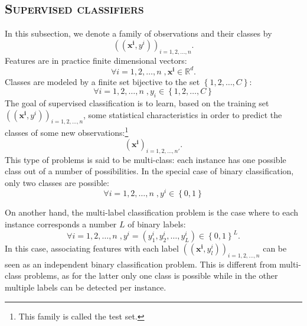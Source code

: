     \subsection{\textsc{Supervised classifiers}}
        \label{subsec::state_of_the_art::mlpr::classifiers}
        In this subsection, we denote a family of observations and their classes by
        \begin{equation*}
            \left((\bm{x^i}, y^i)\right)_{i=1,2,\dots,n}.
        \end{equation*}
        Features are in practice finite dimensional vectors:
        \begin{equation*}
            \forall i=1,2,\dots,n \;, \bm{x^i} \in \mathbb{R}^d.
        \end{equation*}
        Classes are modeled by a finite set bijective to the set \(\left\{1,2,\dots,C\right\}\):
        \begin{equation*}
            \forall i=1,2,\dots,n \;, y_i \in \left\{1,2,\dots,C\right\}            
        \end{equation*}
        The goal of supervised classification is to learn, based on the training set $\left((\bm{x^i}, y^i)\right)_{i=1,2,\dots,n}$, some statistical characteristics in order to predict the classes of some new observations:\footnote{This family is called the test set.}
        \begin{equation*}
            \left(\bm{x^i}\right)_{i=1,2,\dots,n'}.
        \end{equation*}
        This type of problems is said to be multi-class: each instance has one possible class out of a number of possibilities.
        In the special case of binary classification, only two classes are possible:
        \begin{equation*}
            \forall i=1,2,\dots,n \;, y^i \in \left\{0, 1\right\}
        \end{equation*}
        
        On another hand, the multi-label classification problem is the case where to each instance corresponds a number $L$ of binary labels:
        \begin{equation*}
            \forall i=1,2,\dots,n \;, y^i = (y^i_1, y^i_2, \dots, y^i_L) \in \left\{0, 1\right\}^L.
        \end{equation*}
        In this case, associating features with each label \(\left(\left(\bm{x^i}, y^i_l\right)\right)_{i=1,2,\dots,n}\) can be seen as an independent binary classification problem.
        This is different from multi-class problems, as for the latter only one class is possible while in the other multiple labels can be detected per instance.\\

